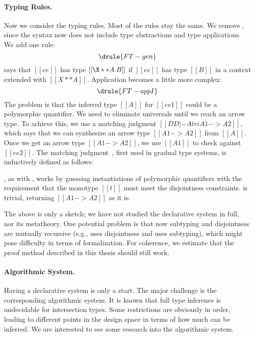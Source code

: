 \paragraph{Typing Rules.}

Now we consider the typing rules. Most of the rules stay the same. We remove
, since the syntax now does not include type abstractions and
type applications. We add one rule:
\[
  \drule{FT-gen}
\]
 says that $[[ee]]$ has type $[[\X ** A . B]]$ if $[[ee]]$ has type $[[B]]$ in a context extended with $[[ X ** A  ]]$.
Application becomes a little more complex:
\[
  \drule{FT-appI}
\]
The problem is that the inferred type $[[A]]$ for $[[ee1]]$ could be a
polymorphic quantifier.
We need to eliminate universals until we
reach an arrow type. To achieve this, we use a matching judgment $[[DD |- A tri A1 -> A2]]$,
which says that we can synthesize an arrow type $[[A1 -> A2]]$ from $[[A]]$.
Once we get an arrow type $[[A1 -> A2]]$, we use $[[A1]]$ to check against $[[ee2]]$.
The matching judgment~\citep{siek2015refined, xie2018consistent}, first used in gradual type systems, is inductively defined as follows:
, as with ,
works by guessing instantiations of polymorphic quantifiers with the requirement
that the monotype $[[t]]$ must meet the disjointness constraints. 
is trivial, returning $[[A1 -> A2]]$ as it is.

The above is only a sketch; we have not studied the declarative system in full,
nor its metatheory. One potential problem is that now subtyping and
disjointness are mutually recursive (e.g.,  uses disjointness and
 uses subtyping), which might pose difficulty in terms of
formalization. For coherence, we estimate that the proof method described in
this thesis should still work.

\paragraph{Algorithmic System.}

Having a declarative system is only a start. The major challenge is the
corresponding algorithmic system. It is known that full type inference is
undecidable for intersection types. Some restrictions are obviously in order,
leading to different points in the design space in terms of how much can be
inferred. We are interested to see some research into the algorithmic system.



